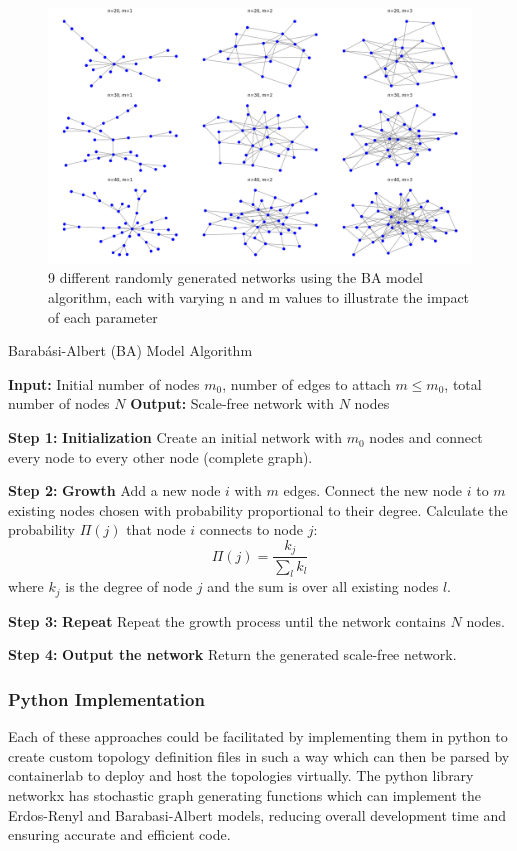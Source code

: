 \begin{figure}
    \centering
    \includegraphics[width=0.75\linewidth]{images/BA_9.png}
    \caption{9 different randomly generated networks using the BA model algorithm, each with varying n and m values to illustrate the impact of each parameter}
    \label{fig:BA_9}
\end{figure}

\begin{algorithm}
\caption{Barabási-Albert (BA) Model Algorithm}\label{alg:BA}
\begin{algorithmic}[1]
\State \textbf{Input:} Initial number of nodes $m_0$, number of edges to attach $m \leq m_0$, total number of nodes $N$
\State \textbf{Output:} Scale-free network with $N$ nodes
\State

\State \textbf{Step 1:} \textbf{Initialization}
\State Create an initial network with $m_0$ nodes and connect every node to every other node (complete graph).

\State \textbf{Step 2:} \textbf{Growth}
    \State Add a new node $i$ with $m$ edges.
    \State Connect the new node $i$ to $m$ existing nodes chosen with probability proportional to their degree.
        \State Calculate the probability $\Pi(j)$ that node $i$ connects to node $j$:
        \[
        \Pi(j) = \frac{k_j}{\sum_{l} k_l}
        \]
        where $k_j$ is the degree of node $j$ and the sum is over all existing nodes $l$.
    \EndFor
\EndFor

\State \textbf{Step 3:} \textbf{Repeat}
\State Repeat the growth process until the network contains $N$ nodes.

\State \textbf{Step 4:} \textbf{Output the network}
\State Return the generated scale-free network.
\end{algorithmic}
\end{algorithm}

\subsubsection{Python Implementation}
Each of these approaches could be facilitated by implementing them in python to create custom topology definition files in such a way which can then be parsed by containerlab to deploy and host the topologies virtually. 
The python library networkx \cite{networkX} has stochastic graph generating functions which can implement the Erdos-Renyl and Barabasi-Albert models, reducing overall development time and ensuring accurate and efficient code. 

